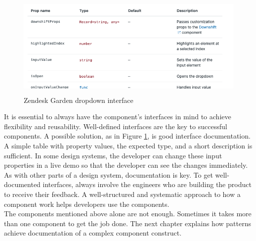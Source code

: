 \begin{figure}[hbtp]
	\centerline{\includegraphics[height=5cm]{images/zendesk_component_interface.png}}
	\caption{Zendesk Garden dropdown interface \cite{zendesk_garden_zendesk_nodate}}
	\label{zen_garden_interface}
\end{figure}
It is essential to always have the component’s interfaces in mind to achieve flexibility and reusability. Well-defined interfaces are the key to successful components. A possible solution, as in Figure \ref{zen_garden_interface}, is good interface documentation. A simple table with property values, the expected type, and a short description is sufficient. In some design systems, the developer can change these input properties in a live demo so that the developer can see the changes immediately.\\
As with other parts of a design system, documentation is key. To get well-documented interfaces, always involve the engineers who are building the product to receive their feedback.  A well-structured and systematic approach to how a component work helps developers use the components.  \cite{vesselov_building_2019}\\
The components mentioned above alone are not enough. Sometimes it takes more than one component to get the job done. The next chapter explains how patterns achieve documentation of a complex component construct. 

